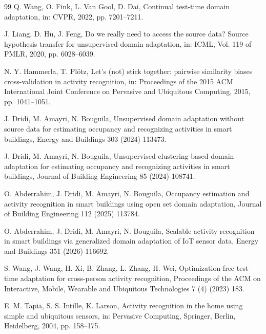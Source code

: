 \documentclass[a4paper,fleqn]{cas-dc}
\begin{document}
\begin{thebibliography}{99}
 Q. Wang, O. Fink, L. Van Gool, D. Dai, Continual test-time domain
adaptation, in: CVPR, 2022, pp. 7201--7211.

 J. Liang, D. Hu, J. Feng, Do we really need to access the source data?
Source hypothesis transfer for unsupervised domain adaptation, in: ICML, Vol. 119 of PMLR,
2020, pp. 6028--6039.

 N. Y. Hammerla, T. Pl\"otz, Let's (not) stick together: pairwise
similarity biases cross-validation in activity recognition, in: Proceedings of the 2015
ACM International Joint Conference on Pervasive and Ubiquitous Computing, 2015,
pp. 1041--1051.

 J. Dridi, M. Amayri, N. Bouguila, Unsupervised domain adaptation
without source data for estimating occupancy and recognizing activities in smart buildings,
Energy and Buildings 303 (2024) 113473.

 J. Dridi, M. Amayri, N. Bouguila, Unsupervised clustering-based
domain adaptation for estimating occupancy and recognizing activities in smart buildings,
Journal of Building Engineering 85 (2024) 108741.

 O. Abderrahim, J. Dridi, M. Amayri, N. Bouguila, Occupancy
estimation and activity recognition in smart buildings using open set domain adaptation,
Journal of Building Engineering 112 (2025) 113784.

 O. Abderrahim, J. Dridi, M. Amayri, N. Bouguila, Scalable activity
recognition in smart buildings via generalized domain adaptation of IoT sensor data, Energy
and Buildings 351 (2026) 116692.

 S. Wang, J. Wang, H. Xi, B. Zhang, L. Zhang, H. Wei, Optimization-free
test-time adaptation for cross-person activity recognition, Proceedings of the ACM on
Interactive, Mobile, Wearable and Ubiquitous Technologies 7 (4) (2023) 183.

 E. M. Tapia, S. S. Intille, K. Larson, Activity recognition in the
home using simple and ubiquitous sensors, in: Pervasive Computing, Springer, Berlin,
Heidelberg, 2004, pp. 158--175.

\end{thebibliography}
\end{document}
